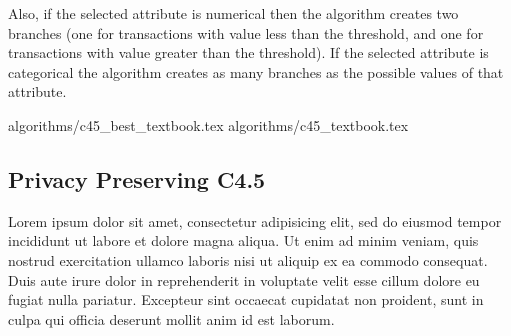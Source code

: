 Also, if the selected attribute is numerical then the algorithm creates two branches (one for transactions with value less than the threshold, and one for transactions with value greater than the threshold).
If the selected attribute is categorical the algorithm creates as many branches as the possible values of that attribute.

{algorithms/c45_best_textbook.tex}
{algorithms/c45_textbook.tex}

\subsection{Privacy Preserving C4.5}\label{s:pp-c45}
Lorem ipsum dolor sit amet, consectetur adipisicing elit, sed do eiusmod tempor incididunt ut labore et dolore magna aliqua. Ut enim ad minim veniam, quis nostrud exercitation ullamco laboris nisi ut aliquip ex ea commodo consequat. Duis aute irure dolor in reprehenderit in voluptate velit esse cillum dolore eu fugiat nulla pariatur. Excepteur sint occaecat cupidatat non proident, sunt in culpa qui officia deserunt mollit anim id est laborum.



